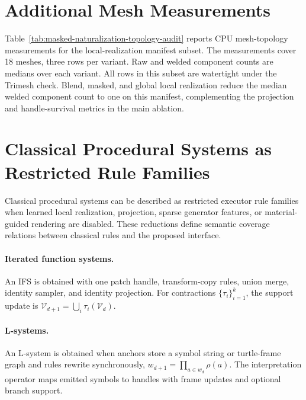 \documentclass[acmtog,anonymous,review]{acmart}
\begin{document}
\section{Additional Mesh Measurements}
\label{app:mesh-diagnostic-audit}
Table~\ref{tab:masked-naturalization-topology-audit} reports CPU mesh-topology measurements for the local-realization manifest subset. The measurements cover 18 meshes, three rows per variant. Raw and welded component counts are medians over each variant. All rows in this subset are watertight under the Trimesh check. Blend, masked, and global local realization reduce the median welded component count to one on this manifest, complementing the projection and handle-survival metrics in the main ablation.

\begin{table}[t]
  \centering
  \small
  \setlength{\tabcolsep}{4pt}
  \caption{Mesh-topology measurements for the local-realization manifest subset, reporting median raw and welded components plus counted watertight rows.}
  \label{tab:masked-naturalization-topology-audit}
  \resizebox{\textwidth}{!}{%
  
  }
\end{table}

\section{Classical Procedural Systems as Restricted Rule Families}
\label{app:classical-limits}
Classical procedural systems can be described as restricted executor rule families when learned local realization, projection, sparse generator features, or material-guided rendering are disabled. These reductions define semantic coverage relations between classical rules and the proposed interface.

\paragraph{Iterated function systems.}
An IFS is obtained with one patch handle, transform-copy rules, union merge, identity sampler, and identity projection. For contractions $\{\tau_i\}_{i=1}^k$, the support update is $\mathcal V_{d+1}=\bigcup_i \tau_i(\mathcal V_d)$.

\paragraph{L-systems.}
An L-system is obtained when anchors store a symbol string or turtle-frame graph and rules rewrite synchronously, $w_{d+1}=\prod_{a\in w_d}\rho(a)$. The interpretation operator maps emitted symbols to handles with frame updates and optional branch support.
\end{document}

